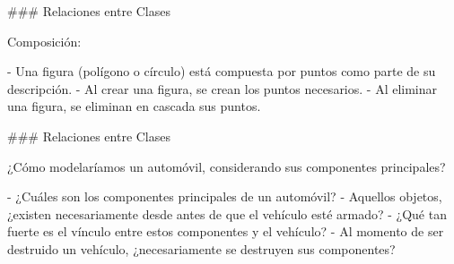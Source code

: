 ### Relaciones entre Clases


\usebox{\umlAgregComp}\par

Composición:

- Una figura (polígono o círculo) está compuesta por puntos como parte
de su descripción.
- Al crear una figura, se crean los puntos necesarios.
- Al eliminar una figura, se eliminan en cascada sus puntos.

### Relaciones entre Clases


¿Cómo modelaríamos un automóvil, considerando sus componentes principales?

- ¿Cuáles son los componentes principales de un automóvil?
- Aquellos objetos, ¿existen necesariamente desde antes de que el vehículo
esté armado?
- ¿Qué tan fuerte es el vínculo entre estos componentes y el vehículo?
- Al momento de ser destruido un vehículo, ¿necesariamente se destruyen
sus componentes?


